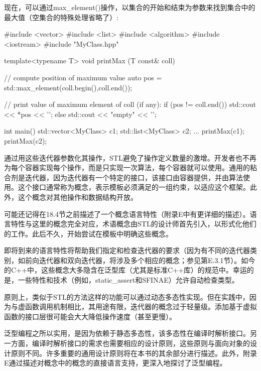 现在，可以通过max\_element()操作，以集合的开始和结束为参数来找到集合中的最大值（空集合的特殊处理省略了）:

\begin{cpp}
#include <vector>
#include <list>
#include <algorithm>
#include <iostream>
#include "MyClass.hpp"

template<typename T>
void printMax (T const& coll) {
	// compute position of maximum value
	auto pos = std::max_element(coll.begin(),coll.end());
	
	// print value of maximum element of coll (if any):
	if (pos != coll.end()) {
		std::cout << *pos << '\n';
	}
	else {
		std::cout << "empty" << '\n';
	}
}

int main() {
	std::vector<MyClass> c1;
	std::list<MyClass> c2;
	...
	printMax(c1);
	printMax(c2);
}
\end{cpp}

通过用这些迭代器参数化其操作，STL避免了操作定义数量的激增。开发者也不再为每个容器实现每个操作，而是只实现一次算法，每个容器就可以使用。通用的粘合剂是迭代器，因为迭代器有一个特定的接口，该接口由容器提供，并由算法使用。这个接口通常称为概念，表示模板必须满足的一组约束，以适应这个框架。此外，这个概念对其他操作和数据结构开放。

可能还记得在18.4节之前描述了一个概念语言特性（附录E中有更详细的描述）。语言特性与这里的概念完全对应，术语概念由STL的设计师首先引入，以形式化他们的工作。此后不久，开始尝试在模板中明确这些概念。

即将到来的语言特性将帮助我们指定和检查迭代器的要求（因为有不同的迭代器类别，如前向迭代器和双向迭代器，将涉及多个相应的概念；参见第E.3.1节）。如今的C++中，这些概念大多隐含在泛型库（尤其是标准C++库）的规范中。幸运的是，一些特性和技术（例如，static\_assert和SFINAE）允许自动检查类型。

原则上，类似于STL的方法这样的功能可以通过动态多态性实现。但在实践中，因为与虚函数调用机制相比，其用途有限，迭代器的概念过于轻量级。添加基于虚拟函数的接口层很可能会大大降低操作速度（甚至更慢）。

泛型编程之所以实用，是因为依赖于静态多态性，该多态性在编译时解析接口。另一方面，编译时解析接口的需求也需要相应的设计原则，这些原则与面向对象的设计原则不同。许多重要的通用设计原则将在本书的其余部分进行描述。此外，附录E通过描述对概念中的概念的直接语言支持，更深入地探讨了泛型编程。























